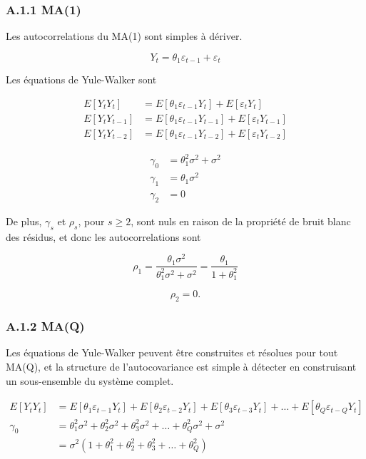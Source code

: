 \documentclass[
  letterpaper,
  DIV=11,
  numbers=noendperiod]{scrartcl}
\begin{document}
\subsubsection{A.1.1 MA(1)}\label{a.1.1-ma1}

Les autocorrelations du MA(1) sont simples à dériver.

\[
Y_t = \theta_1 \varepsilon_{t-1} + \varepsilon_t
\]

Les équations de Yule-Walker sont

\[
\begin{aligned}
E[Y_t Y_t] &= E[\theta_1 \varepsilon_{t-1} Y_t] + E[\varepsilon_t Y_t] \\
E[Y_t Y_{t-1}] &= E[\theta_1 \varepsilon_{t-1} Y_{t-1}] + E[\varepsilon_t Y_{t-1}] \\
E[Y_t Y_{t-2}] &= E[\theta_1 \varepsilon_{t-1} Y_{t-2}] + E[\varepsilon_t Y_{t-2}]
\end{aligned}
\]

\[
\begin{aligned}
\gamma_0 &= \theta_1^2 \sigma^2 + \sigma^2 \\
\gamma_1 &= \theta_1 \sigma^2 \\
\gamma_2 &= 0
\end{aligned}
\]

De plus, \(\gamma_s\) et \(\rho_s\), pour \(s \geq 2\), sont nuls en
raison de la propriété de bruit blanc des résidus, et donc les
autocorrelations sont

\[
\rho_1 = \frac{\theta_1 \sigma^2}{\theta_1^2 \sigma^2 + \sigma^2} = \frac{\theta_1}{1 + \theta_1^2}
\]

\[
\rho_2 = 0.
\]

\subsubsection{A.1.2 MA(Q)}\label{a.1.2-maq}

Les équations de Yule-Walker peuvent être construites et résolues pour
tout MA(Q), et la structure de l'autocovariance est simple à détecter en
construisant un sous-ensemble du système complet.

\[
\begin{aligned}
E[Y_t Y_t] &= E[\theta_1 \varepsilon_{t-1} Y_t] + E[\theta_2 \varepsilon_{t-2} Y_t] + E[\theta_3 \varepsilon_{t-3} Y_t] + \ldots + E[\theta_Q \varepsilon_{t-Q} Y_t] \\
\gamma_0 &= \theta_1^2 \sigma^2 + \theta_2^2 \sigma^2 + \theta_3^2 \sigma^2 + \ldots + \theta_Q^2 \sigma^2 + \sigma^2 \\
&= \sigma^2 (1 + \theta_1^2 + \theta_2^2 + \theta_3^2 + \ldots + \theta_Q^2)
\end{aligned}
\]
\end{document}
